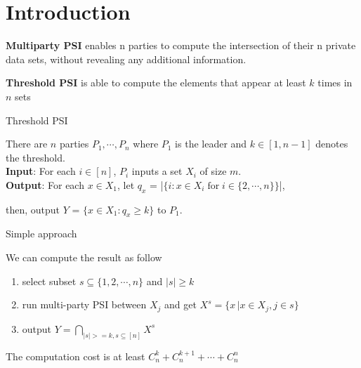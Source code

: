 \section{Introduction}
\begin{frame}

    \textbf{Multiparty PSI} enables n parties to compute the intersection of their n private data sets, without revealing any additional information.

    \vspace{0.5cm}

	\textbf{Threshold PSI} is able to compute the elements that appear at least $k$ times in $n$ sets
    
    \vspace{0.25cm}
  
\begin{block}{Threshold PSI}

    There are $n$ parties $P_1,\cdots,P_n$ where $P_1$ is the leader and
    $k \in [1,n-1]$ denotes the threshold. \\

    \textbf{Input}: For each $i \in [n]$, $P_i$ inputs a set $X_i$ of size $m$.\\

    \textbf{Output}: For each $x \in X_1$, let $q_x$ = |$\{i: x \in X_i \; \text{for} \; i \in \{2,\cdots,n\} \}$|, 

    then, output $Y$ = $\{x \in X_1 : q_x \geq  k \}$ to $P_1$.

\end{block}

\end{frame}

\begin{frame}{Simple approach}

    We can compute the result as follow 

    \begin{enumerate}
        \item select subset $s\subseteq \{1,2,\cdots,n\}$ and $|s| \geq k$
    
        \item run multi-party PSI between $X_j $ and get $X^s = \{x\,| x \in X_j , j \in s \}$
    
        \item output $Y = \bigcap\limits_{|s|>=k,s\subseteq [n]} X^s$
    \end{enumerate}

    \vspace{0.5cm}

    The computation cost is at least $C_n^k+C_n^{k+1}+\cdots +C_n^n$
    
    
    \vspace{0.5cm}

    \color{red}{inefficient and insecure !}

\end{frame}


